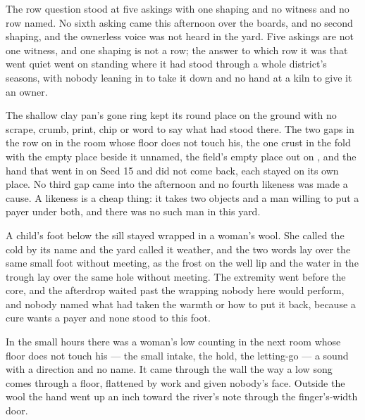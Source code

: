 The row question stood at five askings with one shaping and no witness and no row named. No sixth asking came this afternoon over the boards, and no second shaping, and the ownerless voice was not heard in the yard. Five askings are not one witness, and one shaping is not a row; the answer to which row it was that went quiet went on standing where it had stood through a whole district's seasons, with nobody leaning in to take it down and no hand at a kiln to give it an owner.

The shallow clay pan's gone ring kept its round place on the ground with no scrape, crumb, print, chip or word to say what had stood there. The two gaps in the row on  in the room whose floor does not touch his, the one crust in the fold with the empty place beside it unnamed, the field's empty place out on , and the hand that went in on Seed 15 and did not come back, each stayed on its own place. No third gap came into the afternoon and no fourth likeness was made a cause. A likeness is a cheap thing: it takes two objects and a man willing to put a payer under both, and there was no such man in this yard.

A child's foot below the sill stayed wrapped in a woman's wool. She called the cold by its name and the yard called it weather, and the two words lay over the same small foot without meeting, as the frost on the well lip and the water in the trough lay over the same hole without meeting. The extremity went before the core, and the afterdrop waited past the wrapping nobody here would perform, and nobody named what had taken the warmth or how to put it back, because a cure wants a payer and none stood to this foot.

\scenebreak

In the small hours there was a woman's low counting in the next room whose floor does not touch his --- the small intake, the hold, the letting-go --- a sound with a direction and no name. It came through the wall the way a low song comes through a floor, flattened by work and given nobody's face. Outside the wool the hand went up an inch toward the river's note through the finger's-width door.

